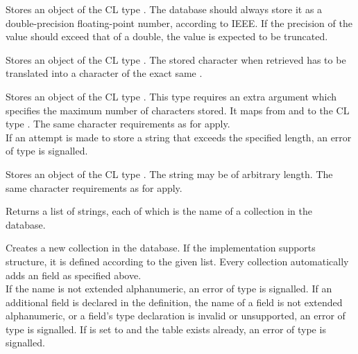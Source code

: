 Stores an object of the CL type . The database should always store it as a double-precision floating-point number, according to IEEE. If the precision of the value should exceed that of a double, the value is expected to be truncated.

Stores an object of the CL type . The stored character when retrieved has to be translated into a character of the exact same .

Stores an object of the CL type . This type requires an extra argument which specifies the maximum number of characters stored. It maps from and to the CL type . The same character requirements as for  apply. \\

\noindent If an attempt is made to store a string that exceeds the specified length, an error of type  is signalled.

Stores an object of the CL type . The string may be of arbitrary length. The same character requirements as for  apply.

Returns a list of strings, each of which is the name of a collection in the database.

Creates a new collection in the database. If the implementation supports structure, it is defined according to the given  list. Every collection automatically adds an  field as specified above. \\

\noindent If the  name is not extended alphanumeric, an error of type  is signalled. If an additional  field is declared in the  definition, the name of a field is not extended alphanumeric, or a field's type declaration is invalid or unsupported, an error of type  is signalled. If  is set to  and the table exists already, an error of type  is signalled.

